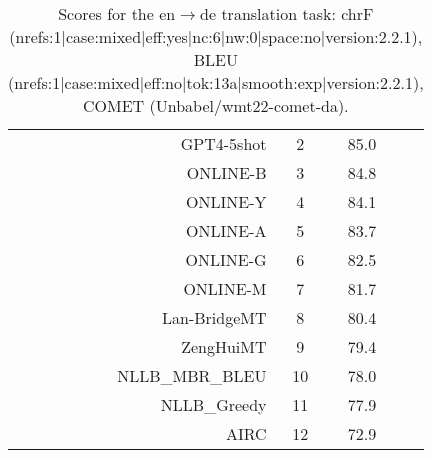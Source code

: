 \documentclass[11pt]{article}
\begin{document}
\begin{table}
\begin{subtable}[t]{0.33\textwidth}
\begin{tabular}{rccc}
GPT4-5shot & 2 & 85.0 \\ 
ONLINE-B & 3 & 84.8 \\ 
ONLINE-Y & 4 & 84.1 \\ 
ONLINE-A & 5 & 83.7 \\ 
ONLINE-G & 6 & 82.5 \\ 
ONLINE-M & 7 & 81.7 \\ 
Lan-BridgeMT & 8 & 80.4 \\ 
ZengHuiMT & 9 & 79.4 \\ 
NLLB\_MBR\_BLEU & 10 & 78.0 \\ 
NLLB\_Greedy & 11 & 77.9 \\ 
AIRC & 12 & 72.9 \\ 
\bottomrule 
\end{tabular} 
\end{subtable} 
\caption{Scores for the en$\rightarrow$de translation task: chrF (nrefs:1|case:mixed|eff:yes|nc:6|nw:0|space:no|version:2.2.1), BLEU (nrefs:1|case:mixed|eff:no|tok:13a|smooth:exp|version:2.2.1), COMET (Unbabel/wmt22-comet-da).} 
\end{table} 
\end{document}
